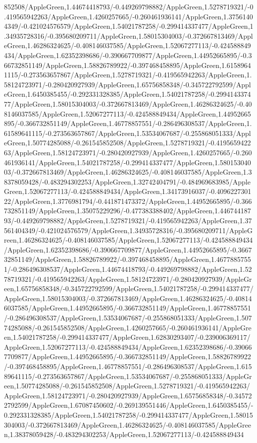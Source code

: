 {\begin{tikzternal}
{852508/AppleGreen,1.44674418793/-0.449269798882/AppleGreen,1.5278719321/-0.419565942263/AppleGreen,1.4260257665/-0.260461936141/AppleGreen,1.37561404349/-0.421024576579/AppleGreen,1.54021787258/-0.299414337477/AppleGreen,1.34935728316/-0.395680209711/AppleGreen,1.58015304003/-0.372667813469/AppleGreen,1.46286324625/-0.408146037585/AppleGreen,1.52067277113/-0.424588849434/AppleGreen,1.62352398686/-0.390667709877/AppleGreen,1.44952665895/-0.366732851149/AppleGreen,1.58826789922/-0.397468458895/AppleGreen,1.61589641115/-0.273563657867/AppleGreen,1.5278719321/-0.419565942263/AppleGreen,1.58124723971/-0.280420927939/AppleGreen,1.65756858348/-0.345722792599/AppleGreen,1.6450385455/-0.292331328385/AppleGreen,1.54021787258/-0.299414337477/AppleGreen,1.58015304003/-0.372667813469/AppleGreen,1.46286324625/-0.408146037585/AppleGreen,1.52067277113/-0.424588849434/AppleGreen,1.44952665895/-0.366732851149/AppleGreen,1.46778857551/-0.286496308537/AppleGreen,1.61589641115/-0.273563657867/AppleGreen,1.53534067687/-0.255868051333/AppleGreen,1.50774285088/-0.261545852508/AppleGreen,1.5278719321/-0.419565942263/AppleGreen,1.58124723971/-0.280420927939/AppleGreen,1.4260257665/-0.260461936141/AppleGreen,1.54021787258/-0.299414337477/AppleGreen,1.58015304003/-0.372667813469/AppleGreen,1.46286324625/-0.408146037585/AppleGreen,1.38378059428/-0.483294302253/AppleGreen,1.32742404791/-0.484969683985/AppleGreen,1.52067277113/-0.424588849434/AppleGreen,1.34173916037/-0.409622730122/AppleGreen,1.3776981794/-0.441871473372/AppleGreen,1.44952665895/-0.366732851149/AppleGreen,1.35075229296/-0.477383388402/AppleGreen,1.44674418793/-0.449269798882/AppleGreen,1.5278719321/-0.419565942263/AppleGreen,1.37561404349/-0.421024576579/AppleGreen,1.34935728316/-0.395680209711/AppleGreen,1.46286324625/-0.408146037585/AppleGreen,1.52067277113/-0.424588849434/AppleGreen,1.62352398686/-0.390667709877/AppleGreen,1.44952665895/-0.366732851149/AppleGreen,1.58826789922/-0.397468458895/AppleGreen,1.46778857551/-0.286496308537/AppleGreen,1.44674418793/-0.449269798882/AppleGreen,1.5278719321/-0.419565942263/AppleGreen,1.58124723971/-0.280420927939/AppleGreen,1.65756858348/-0.345722792599/AppleGreen,1.54021787258/-0.299414337477/AppleGreen,1.58015304003/-0.372667813469/AppleGreen,1.46286324625/-0.408146037585/AppleGreen,1.44952665895/-0.366732851149/AppleGreen,1.46778857551/-0.286496308537/AppleGreen,1.53534067687/-0.255868051333/AppleGreen,1.50774285088/-0.261545852508/AppleGreen,1.4260257665/-0.260461936141/AppleGreen,1.54021787258/-0.299414337477/AppleGreen,1.62830293407/-0.239006369117/AppleGreen,1.52067277113/-0.424588849434/AppleGreen,1.62352398686/-0.390667709877/AppleGreen,1.44952665895/-0.366732851149/AppleGreen,1.58826789922/-0.397468458895/AppleGreen,1.46778857551/-0.286496308537/AppleGreen,1.61589641115/-0.273563657867/AppleGreen,1.53534067687/-0.255868051333/AppleGreen,1.50774285088/-0.261545852508/AppleGreen,1.5278719321/-0.419565942263/AppleGreen,1.58124723971/-0.280420927939/AppleGreen,1.65756858348/-0.345722792599/AppleGreen,1.67087450602/-0.269139551446/AppleGreen,1.6450385455/-0.292331328385/AppleGreen,1.54021787258/-0.299414337477/AppleGreen,1.58015304003/-0.372667813469/AppleGreen,1.46286324625/-0.408146037585/AppleGreen,1.38378059428/-0.483294302253/AppleGreen,1.52067277113/-0.424588849434}
\end{tikzternal}}
